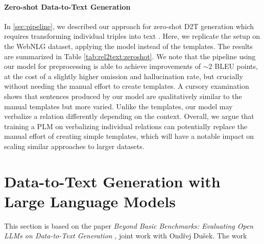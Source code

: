 \paragraph{Zero-shot Data-to-Text Generation} In \autoref{sec:pipeline}, we described our approach for zero-shot D2T generation which requires transforming individual triples into text \cite{kasner2022neural}. Here, we replicate the setup on the WebNLG dataset, applying the \BARTr{} model instead of the templates. The results are summarized in Table \ref{tab:rel2text:zeroshot}.  We note that the pipeline using our model for preprocessing is able to achieve improvements of $\sim$2 BLEU points, at the cost of a slightly higher omission and hallucination rate, but crucially without needing the manual effort to create templates. A cursory examination shows that sentences produced by our model are qualitatively similar to the manual templates but more varied. Unlike the templates, our model may verbalize a relation differently depending on the context.
Overall, we argue that training a PLM on verbalizing individual relations can potentially replace the manual effort of creating simple templates, which will have a notable impact on scaling similar approaches to larger datasets.




\section{Data-to-Text Generation with Large Language Models}
\label{sec:quintd}

\begin{refbox}
    This section is based on the paper \emph{Beyond Basic Benchmarks: Evaluating Open LLMs on Data-to-Text Generation} \cite{kasnerReferenceBasedMetricsAnalyzing2024}, joint work with Ondřej Dušek. The work 
\end{refbox}



